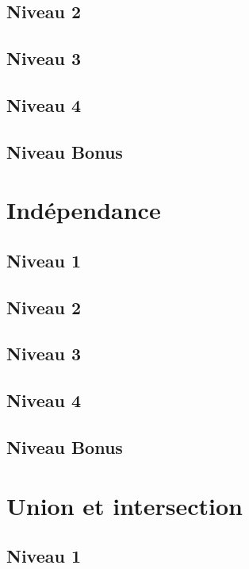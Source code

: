 \documentclass[a4paper]{report}
\begin{document}
			\subsection{Niveau 2}
		
			\subsection{Niveau 3}
			
			\subsection{Niveau 4}
			
			\subsection{Niveau Bonus}
		
		\section{Indépendance}
		
			\subsection{Niveau 1}
		
			\subsection{Niveau 2}
		
			\subsection{Niveau 3}
			
			\subsection{Niveau 4}
			
			\subsection{Niveau Bonus}
		
		\section{Union et intersection}
		
			\subsection{Niveau 1}
		
\end{document}
